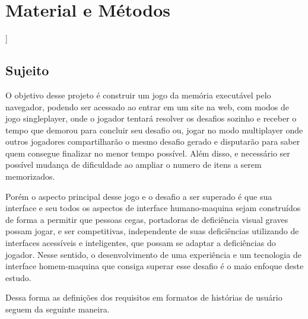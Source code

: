 \chapter{Material e Métodos}]

\label{chap:Material e Métodos}

\section{Sujeito}
O objetivo desse projeto é construir um jogo da memória executável pelo navegador, podendo ser acessado ao entrar em um site na web, com modos de jogo singleplayer, onde o jogador tentará resolver os desafios sozinho e receber o tempo que demorou para concluir seu desafio ou, jogar no modo multiplayer onde outros jogadores compartilharão o mesmo desafio gerado e disputarão para saber quem consegue finalizar no menor tempo possível. Além disso, e necessário ser possível mudança de dificuldade ao ampliar o numero de itens a serem memorizados.

Porém o aspecto principal desse jogo e o desafio a ser superado é que sua interface e seu todos os aspectos de interface humano-maquina sejam construídos de forma a permitir que pessoas cegas, portadoras de deficiência visual graves possam jogar, e ser competitivas, independente de suas deficiências utilizando de interfaces acessíveis e inteligentes, que possam se adaptar a deficiências do jogador. Nesse sentido, o desenvolvimento de uma experiência e um tecnologia de interface homem-maquina que consiga superar esse desafio é o maio enfoque deste estudo.

Dessa forma as definições dos requisitos em formatos de histórias de usuário seguem da seguinte maneira.

